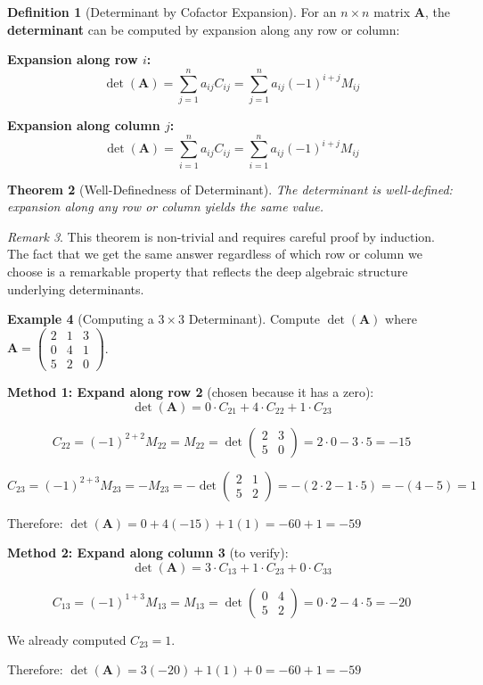 \documentclass[12pt]{article}
\numberwithin{equation}{section}
\newcommand{\mat}[1]{\mathbf{#1}}        %
\theoremstyle{plain}
\newtheorem{theorem}{Theorem}[section]
\theoremstyle{definition}
\newtheorem{definition}[theorem]{Definition}
\newtheorem{example}[theorem]{Example}
\theoremstyle{remark}
\newtheorem{remark}[theorem]{Remark}
\begin{document}
\begin{definition}[Determinant by Cofactor Expansion]
For an $n \times n$ matrix $\mat{A}$, the \textbf{determinant} can be computed by expansion along any row or column:

\textbf{Expansion along row $i$:}
$$\det(\mat{A}) = \sum_{j=1}^n a_{ij}C_{ij} = \sum_{j=1}^n a_{ij}(-1)^{i+j}M_{ij}$$

\textbf{Expansion along column $j$:}
$$\det(\mat{A}) = \sum_{i=1}^n a_{ij}C_{ij} = \sum_{i=1}^n a_{ij}(-1)^{i+j}M_{ij}$$
\end{definition}

\begin{theorem}[Well-Definedness of Determinant]
The determinant is well-defined: expansion along any row or column yields the same value.
\end{theorem}

\begin{remark}
This theorem is non-trivial and requires careful proof by induction. The fact that we get the same answer regardless of which row or column we choose is a remarkable property that reflects the deep algebraic structure underlying determinants.
\end{remark}

\begin{example}[Computing a $3 \times 3$ Determinant]
Compute $\det(\mat{A})$ where $\mat{A} = \begin{pmatrix} 2 & 1 & 3 \\ 0 & 4 & 1 \\ 5 & 2 & 0 \end{pmatrix}$.

\textbf{Method 1: Expand along row 2} (chosen because it has a zero):
$$\det(\mat{A}) = 0 \cdot C_{21} + 4 \cdot C_{22} + 1 \cdot C_{23}$$

$$C_{22} = (-1)^{2+2}M_{22} = M_{22} = \det\begin{pmatrix} 2 & 3 \\ 5 & 0 \end{pmatrix} = 2 \cdot 0 - 3 \cdot 5 = -15$$

$$C_{23} = (-1)^{2+3}M_{23} = -M_{23} = -\det\begin{pmatrix} 2 & 1 \\ 5 & 2 \end{pmatrix} = -(2 \cdot 2 - 1 \cdot 5) = -(4 - 5) = 1$$

Therefore: $\det(\mat{A}) = 0 + 4(-15) + 1(1) = -60 + 1 = -59$

\textbf{Method 2: Expand along column 3} (to verify):
$$\det(\mat{A}) = 3 \cdot C_{13} + 1 \cdot C_{23} + 0 \cdot C_{33}$$

$$C_{13} = (-1)^{1+3}M_{13} = M_{13} = \det\begin{pmatrix} 0 & 4 \\ 5 & 2 \end{pmatrix} = 0 \cdot 2 - 4 \cdot 5 = -20$$

We already computed $C_{23} = 1$.

Therefore: $\det(\mat{A}) = 3(-20) + 1(1) + 0 = -60 + 1 = -59$ \checkmark
\end{example}
\end{document}
